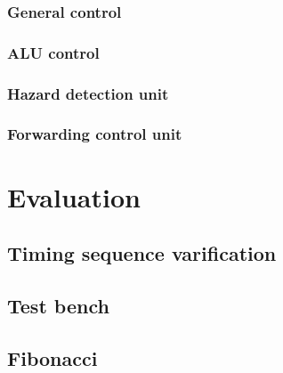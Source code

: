 \documentclass[11pt, a4paper, twoside]{IEEEtran}
\begin{document}
		\subsubsection{General control}
		\subsubsection{ALU control}
		\subsubsection{Hazard detection unit}
		\subsubsection{Forwarding control unit}
		
\section{Evaluation}
	\subsection{Timing sequence varification}
	\subsection{Test bench}
	\subsection{Fibonacci}
	
\end{document}

